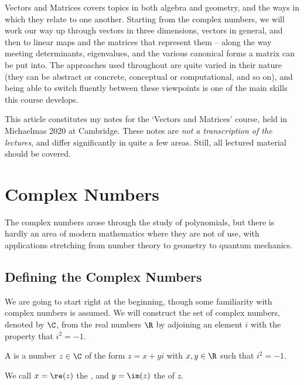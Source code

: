 



Vectors and Matrices covers topics in both algebra and geometry, and the ways in which they relate to one another. Starting from the complex numbers, we will work our way up through vectors in three dimensions, vectors in general, and then to linear maps and the matrices that represent them -- along the way meeting determinants, eigenvalues, and the various canonical forms a matrix can be put into. The approaches used throughout are quite varied in their nature (they can be abstract or concrete, conceptual or computational, and so on), and being able to switch fluently between these viewpoints is one of the main skills this course develops.

This article constitutes my notes for the `Vectors and Matrices' course, held in Michaelmas 2020 at Cambridge. These notes are \emph{not a transcription of the lectures}, and differ significantly in quite a few areas. Still, all lectured material should be covered.





\section{Complex Numbers}

The complex numbers arose through the study of polynomials, but there is hardly an area of modern mathematics where they are not of use, with applications stretching from number theory to geometry to quantum mechanics.


\subsection{Defining the Complex Numbers}

We are going to start right at the beginning, though some familiarity with complex numbers is assumed.
We will construct the set of complex numbers, denoted by $\C$, from the real numbers $\R$ by adjoining an element $i$ with the property that $i^2 = -1$.

\begin{definition}
	A  is a number $z \in \C$ of the form $z = x + yi$ with $x, y \in \R$ such that $i^2 = -1$. 
	
	We call $x = \re(z)$ the , and $y = \im(z)$ the  of $z$.
\end{definition}


